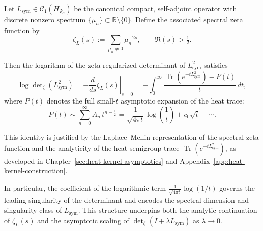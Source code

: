 \begin{lemma}
\label{lem:log_derivative_determinant}
Let \( L_{\mathrm{sym}} \in \mathcal{C}_1(H_{\Psi_\alpha}) \) be the canonical compact, self-adjoint operator with discrete nonzero spectrum \( \{ \mu_n \} \subset \mathbb{R} \setminus \{0\} \). Define the associated spectral zeta function by
\[
\zeta_L(s) := \sum_{\mu_n \neq 0} \mu_n^{-2s}, \qquad \Re(s) > \tfrac{1}{2}.
\]

Then the logarithm of the zeta-regularized determinant of \( L_{\mathrm{sym}}^2 \) satisfies
\[
\log \det\nolimits_{\zeta}(L_{\mathrm{sym}}^2)
= -\left. \frac{d}{ds} \zeta_L(s) \right|_{s=0}
= -\int_0^\infty \frac{\operatorname{Tr}(e^{-t L_{\mathrm{sym}}^2}) - P(t)}{t} \, dt,
\]
where \( P(t) \) denotes the full small-\( t \) asymptotic expansion of the heat trace:
\[
P(t) \sim \sum_{n=0}^\infty A_n\, t^{n - \frac{1}{2}} = \frac{1}{\sqrt{4\pi t}} \log\left( \frac{1}{t} \right) + c_0 \sqrt{t} + \cdots.
\]

\medskip
\noindent
This identity is justified by the Laplace–Mellin representation of the spectral zeta function and the analyticity of the heat semigroup trace \( \operatorname{Tr}(e^{-t L_{\mathrm{sym}}^2}) \), as developed in Chapter~\ref{sec:heat-kernel-asymptotics} and Appendix~\ref{app:heat-kernel-construction}.

\medskip
\noindent
In particular, the coefficient of the logarithmic term \( \frac{1}{\sqrt{4\pi t}} \log(1/t) \) governs the leading singularity of the determinant and encodes the spectral dimension and singularity class of \( L_{\mathrm{sym}} \). This structure underpins both the analytic continuation of \( \zeta_L(s) \) and the asymptotic scaling of \( \det\nolimits_{\zeta}(I + \lambda L_{\mathrm{sym}}) \) as \( \lambda \to 0 \).
\end{lemma}

